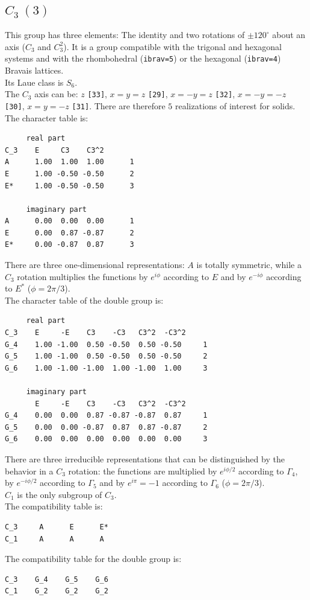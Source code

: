\documentclass[12pt,a4paper]{article}
\begin{document}
\newpage
\subsection{\color{web-blue}$C_3\ (3)$}
This group has three elements: The identity and two rotations of $\pm120^\circ$ 
about an axis ($C_3$ and $C_3^2$).
It is a group compatible with the trigonal and hexagonal systems and with the
rhombohedral (\texttt{ibrav=5}) or the hexagonal (\texttt{ibrav=4}) Bravais 
lattices. \\
Its Laue class is $S_6$. \\
The $C_3$ axis can be: $z$ \texttt{[33]}, $x=y=z$ \texttt{[29]}, 
$x=-y=z$ \texttt{[32]}, $x=-y=-z$ \texttt{[30]}, $x=y=-z$ \texttt{[31]}.
There are therefore $5$ realizations of interest for solids. \\
The character table is:
\begin{verbatim}
     real part
C_3    E     C3    C3^2
A      1.00  1.00  1.00      1
E      1.00 -0.50 -0.50      2
E*     1.00 -0.50 -0.50      3

     imaginary part
A      0.00  0.00  0.00      1
E      0.00  0.87 -0.87      2
E*     0.00 -0.87  0.87      3 
\end{verbatim}
There are three one-dimensional representations: $A$ is totally symmetric, while
a $C_3$ rotation multiplies the functions by $e^{i\phi}$ according to $E$
and by $e^{-i\phi}$ according to $E^*$ ($\phi=2 \pi / 3$). \\
The character table of the double group is:
\begin{verbatim}
     real part
C_3    E     -E    C3    -C3   C3^2  -C3^2
G_4    1.00 -1.00  0.50 -0.50  0.50 -0.50     1
G_5    1.00 -1.00  0.50 -0.50  0.50 -0.50     2
G_6    1.00 -1.00 -1.00  1.00 -1.00  1.00     3

     imaginary part
       E     -E    C3    -C3   C3^2  -C3^2
G_4    0.00  0.00  0.87 -0.87 -0.87  0.87     1
G_5    0.00  0.00 -0.87  0.87  0.87 -0.87     2
G_6    0.00  0.00  0.00  0.00  0.00  0.00     3
\end{verbatim}
There are three irreducible representations that can be distinguished by the
behavior in a $C_3$ rotation: the functions are multiplied by $e^{i\phi/2}$ according
to $\Gamma_4$, by $e^{-i\phi/2}$ according to $\Gamma_5$ and by $e^{i\pi}=-1$ 
according to $\Gamma_6$ ($\phi=2 \pi / 3$). \\
$C_1$ is the only subgroup of $C_3$. \\
The compatibility table is:
\begin{verbatim}
C_3     A      E      E*  
C_1     A      A      A
\end{verbatim}
The compatibility table for the double group is:
\begin{verbatim}
C_3    G_4    G_5    G_6 
C_1    G_2    G_2    G_2
\end{verbatim}
\end{document}
